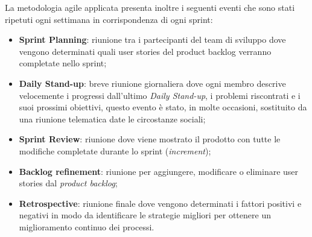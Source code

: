 \noindent
La metodologia agile applicata presenta inoltre i seguenti eventi che sono stati ripetuti ogni settimana in corrispondenza di ogni sprint:
\begin{itemize}
	\item \textbf{Sprint Planning}: riunione tra i partecipanti del team di sviluppo dove vengono determinati quali user stories del product backlog verranno completate nello sprint;
	
	\item \textbf{Daily Stand-up}: breve riunione giornaliera dove ogni membro descrive velocemente i progressi dall'ultimo  \emph{Daily Stand-up}, i problemi riscontrati e i suoi prossimi obiettivi, questo evento è stato, in molte occasioni, sostituito da una riunione telematica date le circostanze sociali;
	
	\item \textbf{Sprint Review}: riunione dove viene mostrato il prodotto con tutte le modifiche completate durante lo sprint (\emph{increment});
	
	\item \textbf{Backlog refinement}: riunione per aggiungere, modificare o eliminare user stories dal \emph{product backlog};
	
	\item \textbf{Retrospective}: riunione finale dove vengono determinati i fattori positivi e negativi in modo da identificare le strategie migliori per ottenere un miglioramento continuo dei processi.
\end{itemize}
\noindent

